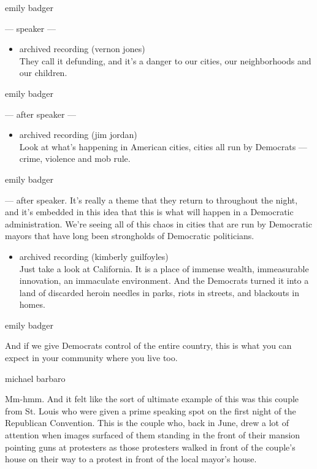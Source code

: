 emily badger

--- speaker ---

\begin{itemize}
\tightlist
\item
  archived recording (vernon jones)\\
  They call it defunding, and it's a danger to our cities, our
  neighborhoods and our children.
\end{itemize}

emily badger

--- after speaker ---

\begin{itemize}
\tightlist
\item
  archived recording (jim jordan)\\
  Look at what's happening in American cities, cities all run by
  Democrats --- crime, violence and mob rule.
\end{itemize}

emily badger

--- after speaker. It's really a theme that they return to throughout
the night, and it's embedded in this idea that this is what will happen
in a Democratic administration. We're seeing all of this chaos in cities
that are run by Democratic mayors that have long been strongholds of
Democratic politicians.

\begin{itemize}
\tightlist
\item
  archived recording (kimberly guilfoyles)\\
  Just take a look at California. It is a place of immense wealth,
  immeasurable innovation, an immaculate environment. And the Democrats
  turned it into a land of discarded heroin needles in parks, riots in
  streets, and blackouts in homes.
\end{itemize}

emily badger

And if we give Democrats control of the entire country, this is what you
can expect in your community where you live too.

michael barbaro

Mm-hmm. And it felt like the sort of ultimate example of this was this
couple from St. Louis who were given a prime speaking spot on the first
night of the Republican Convention. This is the couple who, back in
June, drew a lot of attention when images surfaced of them standing in
the front of their mansion pointing guns at protesters as those
protesters walked in front of the couple's house on their way to a
protest in front of the local mayor's house.

